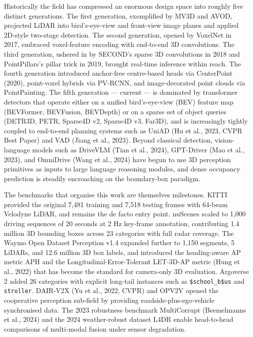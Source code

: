 Historically the field has compressed an enormous design space into roughly five distinct generations. The first generation, exemplified by MV3D and AVOD, projected LiDAR into bird's-eye-view and front-view image planes and applied 2D-style two-stage detection. The second generation, opened by VoxelNet in 2017, embraced voxel-feature encoding with end-to-end 3D convolutions. The third generation, ushered in by SECOND's sparse 3D convolutions in 2018 and PointPillars's pillar trick in 2019, brought real-time inference within reach. The fourth generation introduced anchor-free centre-based heads via CenterPoint (2020), point-voxel hybrids via PV-RCNN, and image-decorated point clouds via PointPainting. The fifth generation --- current --- is dominated by transformer detectors that operate either on a unified bird's-eye-view (BEV) feature map (BEVFormer, BEVFusion, BEVDepth) or on a sparse set of object queries (DETR3D, PETR, Sparse4D v2, Sparse4D v3, Far3D), and is increasingly tightly coupled to end-to-end planning systems such as UniAD (Hu et al., 2023, CVPR Best Paper) and VAD (Jiang et al., 2023). Beyond classical detection, vision-language models such as DriveVLM (Tian et al., 2024), GPT-Driver (Mao et al., 2023), and OmniDrive (Wang et al., 2024) have begun to use 3D perception primitives as inputs to large language reasoning modules, and dense occupancy prediction is steadily encroaching on the boundary-box paradigm.

The benchmarks that organise this work are themselves milestones. KITTI provided the original 7,481 training and 7,518 testing frames with 64-beam Velodyne LiDAR, and remains the de facto entry point. nuScenes scaled to 1,000 driving sequences of 20 seconds at 2 Hz key-frame annotation, contributing 1.4 million 3D bounding boxes across 23 categories with full radar coverage. The Waymo Open Dataset Perception v1.4 expanded further to 1,150 segments, 5 LiDARs, and 12.6 million 3D box labels, and introduced the heading-aware AP metric APH and the Longitudinal-Error-Tolerant LET-3D-AP metric (Hung et al., 2022) that has become the standard for camera-only 3D evaluation. Argoverse 2 added 26 categories with explicit long-tail instances such as \texttt{\$school\_b\$us} and \texttt{stroller}. DAIR-V2X (Yu et al., 2022, CVPR) and OPV2V opened the cooperative perception sub-field by providing roadside-plus-ego-vehicle synchronised data. The 2023 robustness benchmark MultiCorrupt (Beemelmanns et al., 2024) and the 2024 weather-robust dataset L4DR enable head-to-head comparisons of multi-modal fusion under sensor degradation.

